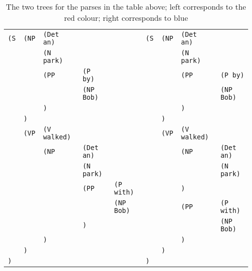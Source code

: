 \documentclass[a4paper]{article}
\begin{document}
\begin{enumerate}
\begin{enumerate}
\begin{enumerate}
\begin{itemize}
\begin{table}[hb]
\begin{tabular}{lllll|llll}
\texttt{(S} & \texttt{(NP} & \texttt{(Det an)} & & & \texttt{(S} & \texttt{(NP} & \texttt{(Det an)} & \\
 & & \texttt{(N park)} & & & & & \texttt{(N park)} & \\
 & & \texttt{(PP} & \texttt{(P by)} & & & & \texttt{(PP} & \texttt{(P by)} \\
 & & & \texttt{(NP Bob)} & & & & & \texttt{(NP Bob)} \\
 & & \texttt{)} & & & & & \texttt{)} & \\
 & \texttt{)} & & & & & \texttt{)} & & \\
 & \texttt{(VP} & \texttt{(V walked)} & & & & \texttt{(VP} & \texttt{(V walked)} &\\
 & & \texttt{(NP} & \texttt{(Det an)} & & & & \texttt{(NP} & \texttt{(Det an)} \\
 & & & \texttt{(N park)} & & & & & \texttt{(N park)} \\
 & & & \texttt{(PP} & \texttt{(P with)} & & & \texttt{)} & \\
 & & & & \texttt{(NP Bob)} & & & \texttt{(PP} & \texttt{(P with)} \\
 & & & \texttt{)} & & & & & \texttt{(NP Bob)} \\
 & & \texttt{)} & & & & & \texttt{)} & \\ 
 & \texttt{)} & & & & & \texttt{)} & & \\
\texttt{)} & & & & & \texttt{)} & & & 
\end{tabular}
\caption{The two trees for the parses in the table above; left corresponds to the red colour; right corresponds to blue}
\end{table}
\end{itemize}
\end{enumerate}
\end{enumerate}



\end{enumerate}
\end{document}
